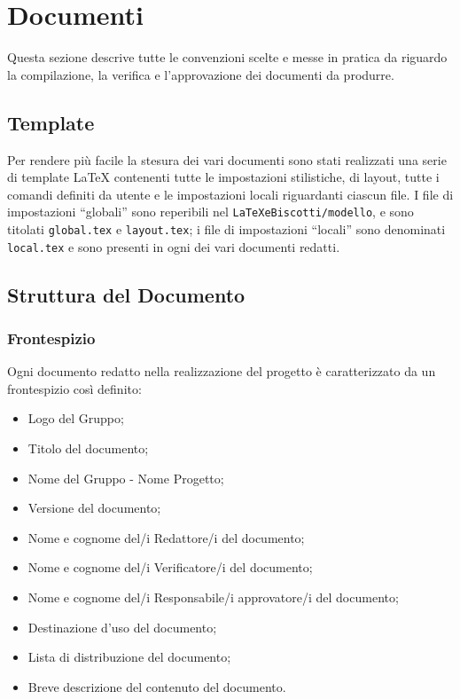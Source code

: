 \section{Documenti}
Questa sezione descrive tutte le convenzioni scelte e messe in pratica da \GroupName{} riguardo la compilazione, la verifica e l'approvazione dei documenti da produrre.

\subsection{Template}

Per rendere più facile la stesura dei vari documenti sono stati realizzati una serie di template \LaTeX{} contenenti tutte le impostazioni stilistiche, di layout, tutte i comandi definiti da utente e le impostazioni locali riguardanti ciascun file. I file di impostazioni “globali” sono reperibili nel  \texttt{LaTeXeBiscotti/modello}, e sono titolati \texttt{global.tex} e \texttt{layout.tex}; i file di impostazioni “locali” sono denominati \texttt{local.tex} e sono presenti in ogni  dei vari documenti redatti.

\subsection{Struttura del Documento}
\subsubsection{Frontespizio}
Ogni documento redatto nella realizzazione del progetto è caratterizzato da un frontespizio così definito:
\begin{itemize}
\item Logo del Gruppo;
\item Titolo del documento;
\item Nome del Gruppo - Nome Progetto;
\item Versione del documento;
\item Nome e cognome del/i Redattore/i del documento;
\item Nome e cognome del/i Verificatore/i del documento;
\item Nome e cognome del/i Responsabile/i approvatore/i del documento;
\item Destinazione d'uso del documento;
\item Lista di distribuzione del documento;
\item Breve descrizione del contenuto del documento.
\end{itemize}

